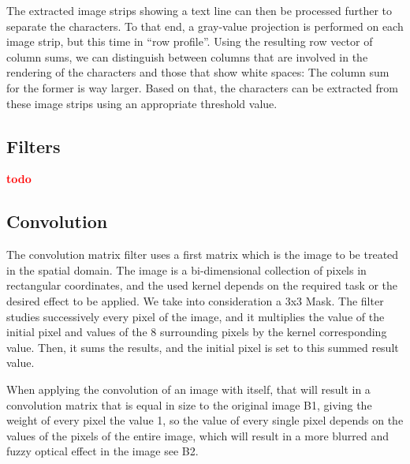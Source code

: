 \documentclass[a4paper,twocolumn]{article}
\newcommand{\twodo}{\vspace{11pt}\textcolor{red}{\textbf{todo}}}
\begin{document}
	The extracted image strips showing a text line can then be processed further to separate the characters. To that end, a gray-value projection is performed on each image strip, but this time in ``row profile''. Using the resulting row vector of column sums, we can distinguish between columns that are involved in the rendering of the characters and those that show white spaces: The column sum for the former is way larger. Based on that, the characters can be extracted from these image strips using an appropriate threshold value.
	
	\subsection{Filters}
	
	\twodo{}
	
	
	\subsection{Convolution}
	
	The convolution matrix  filter uses a first matrix which is the image to be treated in the spatial domain. The image is a bi-dimensional collection of pixels in rectangular coordinates, and the used kernel depends on the required task or the desired effect to be applied. We take into consideration a 3x3 Mask. The  filter studies successively every pixel of the image, and it multiplies the value of the initial pixel and values of the 8 surrounding pixels by the kernel corresponding value. Then, it sums the results, and the initial pixel is set to this summed result value.
	
	When applying the convolution of an image with itself, that will result in a convolution matrix that is equal in size to the original image B1, giving the weight of every pixel the value 1, so the value of every single pixel depends on the values of the pixels of the entire image, which will result in a more blurred and fuzzy optical effect in the image see B2.
	
\end{document}
